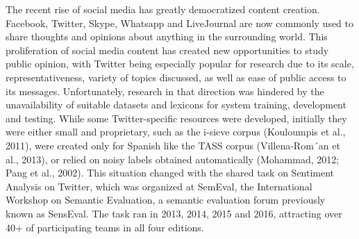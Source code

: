 The recent rise of social media has greatly democratized content creation. Facebook, Twitter, Skype, Whatsapp and LiveJournal are now commonly used to share thoughts and opinions about anything in the surrounding world. This proliferation of social media content has created new opportunities to study public opinion, with Twitter being especially popular for research due to its scale, representativeness, variety of topics discussed, as well as ease of public access to its messages. Unfortunately, research in that direction was hindered by the unavailability of suitable datasets and lexicons for system training, development and testing. While some Twitter-specific resources were developed, initially they were either small and proprietary, such as the i-sieve corpus (Kouloumpis et al., 2011), were created only for Spanish like the TASS corpus (Villena-Rom´an et al., 2013), or relied on noisy labels obtained automatically (Mohammad, 2012; Pang et al., 2002). This situation changed with the shared task on Sentiment Analysis on Twitter, which was organized at SemEval, the International Workshop on Semantic Evaluation, a semantic evaluation forum previously known as SensEval. The task ran in 2013, 2014, 2015 and 2016, attracting over 40+ of participating teams in all four editions.
